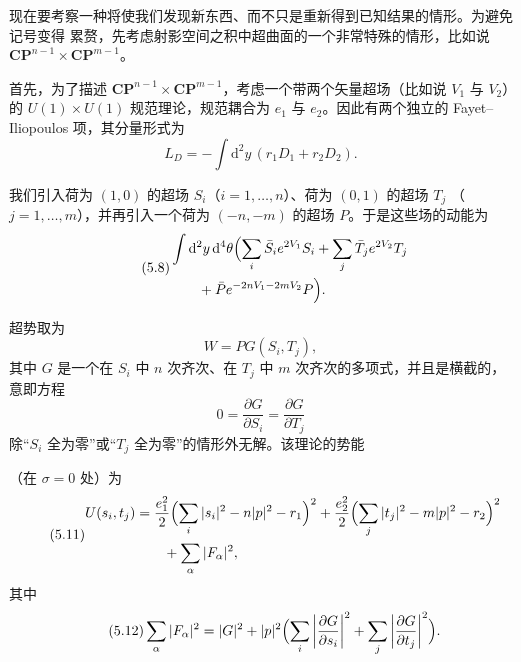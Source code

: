 现在要考察一种将使我们发现新东西、而不只是重新得到已知结果的情形。为避免记号变得
累赘，先考虑射影空间之积中超曲面的一个非常特殊的情形，比如说
$\mathbf{CP}^{n-1}\times\mathbf{CP}^{m-1}$。

首先，为了描述 $\mathbf{CP}^{n-1}\times\mathbf{CP}^{m-1}$，考虑一个带两个矢量超场（比如说
$V_1$ 与 $V_2$）的 $U(1)\times U(1)$ 规范理论，规范耦合为 $e_1$ 与 $e_2$。因此有两个独立的
Fayet--Iliopoulos 项，其分量形式为
\begin{equation}
L_D=-\int\mathrm{d}^2y\,(r_1D_1+r_2D_2).
\tag{5.7}
\end{equation}

我们引入荷为 $(1,0)$ 的超场 $S_i$（$i=1,\dots,n$）、荷为 $(0,1)$ 的超场 $T_j$
（$j=1,\dots,m$），并再引入一个荷为 $(-n,-m)$ 的超场 $P$。于是这些场的动能为
\begin{equation}
\tag{5.8}
\begin{aligned}
&\int\mathrm{d}^2y\,\mathrm{d}^4\theta\Bigl(\sum_i\bar S_ie^{2V_1}S_i
+\sum_j\bar T_je^{2V_2}T_j\\
&\qquad+\bar Pe^{-2nV_1-2mV_2}P\Bigr).
\end{aligned}
\end{equation}

超势取为
\begin{equation}
W=PG(S_i,T_j),
\tag{5.9}
\end{equation}
其中 $G$ 是一个在 $S_i$ 中 $n$ 次齐次、在 $T_j$ 中 $m$ 次齐次的多项式，并且是横截的，
意即方程
\begin{equation}
0=\frac{\partial G}{\partial S_i}=\frac{\partial G}{\partial T_j}
\tag{5.10}
\end{equation}
除“$S_i$ 全为零”或“$T_j$ 全为零”的情形外无解。该理论的势能

\label{op:53}
（在 $\sigma=0$ 处）为
\begin{equation}
\tag{5.11}
\begin{aligned}
U(s_i,t_j)&=\frac{e_1^2}{2}\Bigl(\sum_i|s_i|^2-n|p|^2-r_1\Bigr)^2
+\frac{e_2^2}{2}\Bigl(\sum_j|t_j|^2-m|p|^2-r_2\Bigr)^2\\
&\qquad+\sum_\alpha|F_\alpha|^2,
\end{aligned}
\end{equation}
其中
\begin{equation}
\tag{5.12}
\sum_\alpha|F_\alpha|^2=|G|^2+|p|^2\Bigl(\sum_i\left|\frac{\partial G}{\partial s_i}\right|^2
+\sum_j\left|\frac{\partial G}{\partial t_j}\right|^2\Bigr).
\end{equation}

